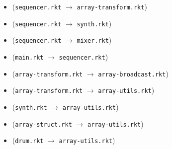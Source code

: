 \documentclass{article}
\newcommand{\mono}[1]{\texttt{#1}}
\begin{document}
\begin{itemize}
\begin{itemize}
  \item (\mono{sequencer.rkt} $\rightarrow$ \mono{array-transform.rkt})
  \item (\mono{sequencer.rkt} $\rightarrow$ \mono{synth.rkt})
  \item (\mono{sequencer.rkt} $\rightarrow$ \mono{mixer.rkt})
  \item (\mono{main.rkt} $\rightarrow$ \mono{sequencer.rkt})
  \item (\mono{array-transform.rkt} $\rightarrow$ \mono{array-broadcast.rkt})
  \item (\mono{array-transform.rkt} $\rightarrow$ \mono{array-utils.rkt})
  \item (\mono{synth.rkt} $\rightarrow$ \mono{array-utils.rkt})
  \item (\mono{array-struct.rkt} $\rightarrow$ \mono{array-utils.rkt})
  \item (\mono{drum.rkt} $\rightarrow$ \mono{array-utils.rkt})
  \end{itemize}


\end{itemize}
\end{document}
